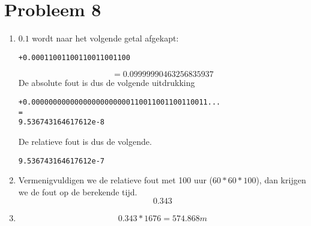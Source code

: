 \documentclass[12pt,a4paper]{article}
\begin{document}
\section{Probleem 8}
\begin{enumerate}
\item $0.1$ wordt naar het volgende getal afgekapt:
{\scriptsize \begin{verbatim}
+0.00011001100110011001100
\end{verbatim}}
\[
= 0.09999990463256835937
\]
De absolute fout is dus de volgende uitdrukking
{\scriptsize \begin{verbatim}
+0.00000000000000000000000110011001100110011...
=
9.536743164617612e-8
\end{verbatim}}
De relatieve fout is dus de volgende.
{\scriptsize \begin{verbatim}
9.536743164617612e-7
\end{verbatim}}

\item Vermenigvuldigen we de relatieve fout met 100 uur ($60*60*100$), dan krijgen we de fout op de berekende tijd.
\[
0.343
\]

\item
\[
0.343 * 1676 = 574.868m
\]
\end{enumerate}
\end{document}
